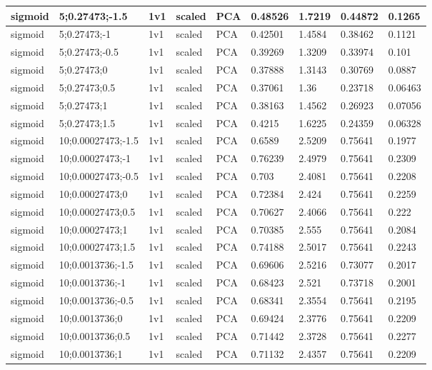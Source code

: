 \begin{longtable}{lllllllll}
sigmoid & 5;0.27473;-1.5 & 1v1 & scaled & PCA & 0.48526 & 1.7219 & 0.44872 & 0.1265\\ \hline
sigmoid & 5;0.27473;-1 & 1v1 & scaled & PCA & 0.42501 & 1.4584 & 0.38462 & 0.1121\\ \hline
sigmoid & 5;0.27473;-0.5 & 1v1 & scaled & PCA & 0.39269 & 1.3209 & 0.33974 & 0.101\\ \hline
sigmoid & 5;0.27473;0 & 1v1 & scaled & PCA & 0.37888 & 1.3143 & 0.30769 & 0.0887\\ \hline
sigmoid & 5;0.27473;0.5 & 1v1 & scaled & PCA & 0.37061 & 1.36 & 0.23718 & 0.06463\\ \hline
sigmoid & 5;0.27473;1 & 1v1 & scaled & PCA & 0.38163 & 1.4562 & 0.26923 & 0.07056\\ \hline
sigmoid & 5;0.27473;1.5 & 1v1 & scaled & PCA & 0.4215 & 1.6225 & 0.24359 & 0.06328\\ \hline
sigmoid & 10;0.00027473;-1.5 & 1v1 & scaled & PCA & 0.6589 & 2.5209 & 0.75641 & 0.1977\\ \hline
sigmoid & 10;0.00027473;-1 & 1v1 & scaled & PCA & 0.76239 & 2.4979 & 0.75641 & 0.2309\\ \hline
sigmoid & 10;0.00027473;-0.5 & 1v1 & scaled & PCA & 0.703 & 2.4081 & 0.75641 & 0.2208\\ \hline
sigmoid & 10;0.00027473;0 & 1v1 & scaled & PCA & 0.72384 & 2.424 & 0.75641 & 0.2259\\ \hline
sigmoid & 10;0.00027473;0.5 & 1v1 & scaled & PCA & 0.70627 & 2.4066 & 0.75641 & 0.222\\ \hline
sigmoid & 10;0.00027473;1 & 1v1 & scaled & PCA & 0.70385 & 2.555 & 0.75641 & 0.2084\\ \hline
sigmoid & 10;0.00027473;1.5 & 1v1 & scaled & PCA & 0.74188 & 2.5017 & 0.75641 & 0.2243\\ \hline
sigmoid & 10;0.0013736;-1.5 & 1v1 & scaled & PCA & 0.69606 & 2.5216 & 0.73077 & 0.2017\\ \hline
sigmoid & 10;0.0013736;-1 & 1v1 & scaled & PCA & 0.68423 & 2.521 & 0.73718 & 0.2001\\ \hline
sigmoid & 10;0.0013736;-0.5 & 1v1 & scaled & PCA & 0.68341 & 2.3554 & 0.75641 & 0.2195\\ \hline
sigmoid & 10;0.0013736;0 & 1v1 & scaled & PCA & 0.69424 & 2.3776 & 0.75641 & 0.2209\\ \hline
sigmoid & 10;0.0013736;0.5 & 1v1 & scaled & PCA & 0.71442 & 2.3728 & 0.75641 & 0.2277\\ \hline
sigmoid & 10;0.0013736;1 & 1v1 & scaled & PCA & 0.71132 & 2.4357 & 0.75641 & 0.2209\\ \hline

\end{longtable}
